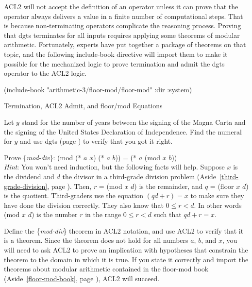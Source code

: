 \begin{aside}
ACL2 will not accept the definition of
an operator unless
it can prove that the operator always delivers a value in
a finite number of computational steps.
That is because non-terminating operators complicate the reasoning process.
Proving that dgts terminates for all inputs
requires applying some theorems of modular arithmetic.
Fortunately, experts have put together a package of theorems on that topic,
and the following include-book directive will import them
to make it possible for the mechanized logic to prove termination
and admit the dgts operator to the ACL2 logic.
\vspace{2mm}
\begin{center}
(include-book "arithmetic-3/floor-mod/floor-mod" :dir :system)
\end{center}
\caption{Termination, ACL2 Admit, and floor/mod Equations}
\label{admit-def}
\label{floor-mod-book}
\label{floor-mod-include-book}
\end{aside}

\begin{ExerciseList}
\Exercise Let $y$ stand for the number of years
between the signing of the Magna Carta and
the signing of the United States Declaration of Independence.
Find the numeral for $y$ and use dgts (page \pageref{dgts-defun})
to verify that you got it right.

\Exercise \label{modular-division}
Prove \{\emph{mod-div}\}:
(mod (* $a$ $x$) (* $a$ $b$)) = (* $a$ (mod $x$ $b$)) \\
\emph{Hint}: You won't need induction, but the following facts will help.
Suppose $x$ is the dividend and $d$ the divisor
in a third-grade division problem
(Aside~\ref{third-grade-division}, page \pageref{third-grade-division}).
Then, $r$ = (mod $x$ $d$) is the remainder,
and $q$ = (floor $x$ $d$) is the quotient.
Third-graders use the equation $(qd + r) = x$
to make sure they have done the division correctly.
They also know that $0 \le r < d$.
In other words (mod $x$ $d$) is the number $r$
in the range $0 \le r < d$ such that $qd + r = x$.

\Exercise \label{mod-div-defthm}Define
the \{\emph{mod-div}\} theorem
in ACL2 notation, and use ACL2 to verify that it is a theorem.
Since the theorem does not hold for all numbers $a$, $b$, and $x$,
you will need to ask ACL2 to prove an implication with
hypotheses that constrain the theorem to the domain in which it is true.
If you state it correctly and import the
theorems about modular arithmetic contained in the floor-mod book
(Aside~\ref{floor-mod-book}, page \pageref{floor-mod-book}),
ACL2 will succeed.
\end{ExerciseList}

